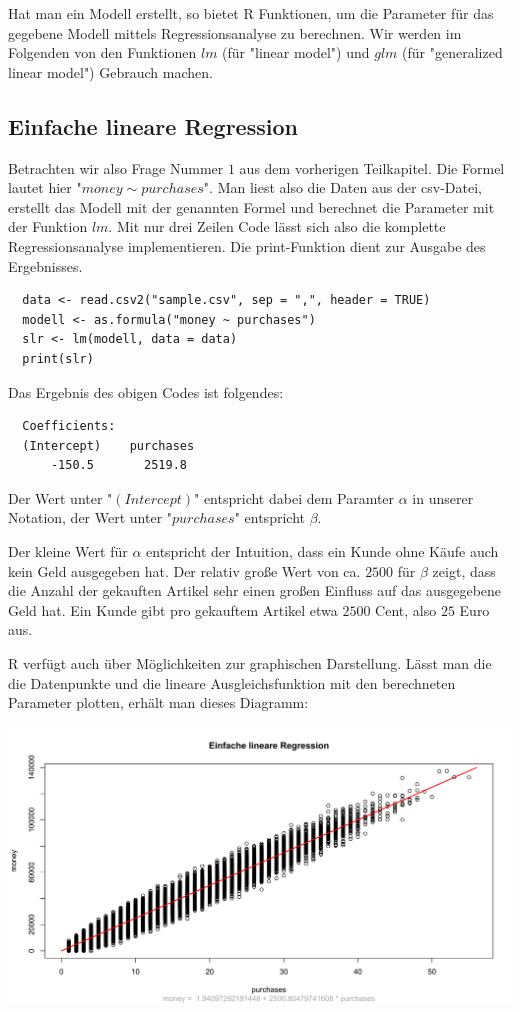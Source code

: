 Hat man ein Modell erstellt, so bietet R Funktionen, um die Parameter für das gegebene Modell mittels Regressionsanalyse zu berechnen. Wir werden im Folgenden von den Funktionen $lm$ (für "linear model") und $glm$ (für "generalized linear model") Gebrauch machen.

\subsection{Einfache lineare Regression}
\label{subsection:3:2:2}

Betrachten wir also Frage Nummer $1$ aus dem vorherigen Teilkapitel. Die Formel lautet hier "$money \sim purchases$". Man liest also die Daten aus der csv-Datei, erstellt das Modell mit der genannten Formel und berechnet die Parameter mit der Funktion $lm$. Mit nur drei Zeilen Code lässt sich also die komplette Regressionsanalyse implementieren. Die print-Funktion dient zur Ausgabe des Ergebnisses.

\begin{verbatim}
  data <- read.csv2("sample.csv", sep = ",", header = TRUE)
  modell <- as.formula("money ~ purchases")
  slr <- lm(modell, data = data)
  print(slr)
\end{verbatim}

Das Ergebnis des obigen Codes ist folgendes:

\begin{verbatim}
  Coefficients:
  (Intercept)    purchases
      -150.5       2519.8
\end{verbatim}

Der Wert unter "$(Intercept)$" entspricht dabei dem Paramter $\alpha$ in unserer Notation, der Wert unter "$purchases$" entspricht $\beta$.

Der kleine Wert für $\alpha$ entspricht der Intuition, dass ein Kunde ohne Käufe auch kein Geld ausgegeben hat. Der relativ große Wert von ca. $2500$ für $\beta$ zeigt, dass die Anzahl der gekauften Artikel sehr einen großen Einfluss auf das ausgegebene Geld hat. Ein Kunde gibt pro gekauftem Artikel etwa $2500$ Cent, also $25$ Euro aus.

R verfügt auch über Möglichkeiten zur graphischen Darstellung. Lässt man die die Datenpunkte und die lineare Ausgleichsfunktion mit den berechneten Parameter plotten, erhält man dieses Diagramm:

\includegraphics[width=\textwidth]{r-simpleLinearRegression}

